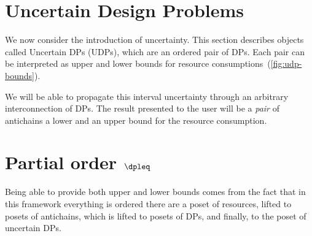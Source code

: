 \section{Uncertain Design Problems\label{sec:UDP}}

We now consider the introduction of uncertainty. This section describes
objects called Uncertain DPs (UDPs), which are an ordered pair of
DPs. Each pair can be interpreted as upper and lower bounds for resource
consumptions~(\cref{fig:udp-bounds}).


We will be able to propagate this interval uncertainty through an
arbitrary interconnection of DPs. The result presented to the user
will be a \emph{pair} of antichains \textemdash{} a lower and an upper
bound for the resource consumption.

\section{Partial order $\dpleq$}

Being able to provide both upper and lower bounds comes from the fact
that in this framework everything is ordered \textendash{} there are
a poset of resources, lifted to posets of antichains, which is lifted
to posets of DPs, and finally, to the poset of uncertain DPs.

